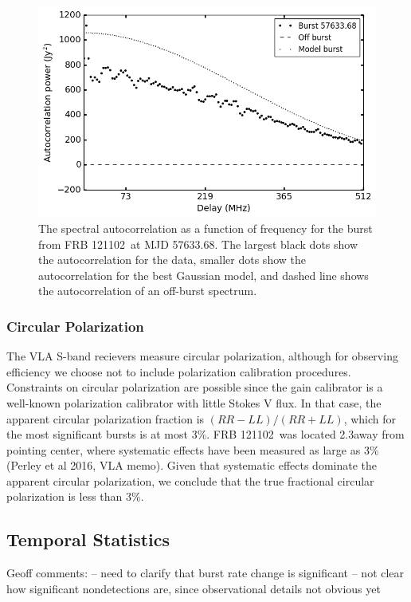 \documentclass[twocolumn]{aastex61}
\newcommand{\frb}{FRB 121102}
\begin{document}

\begin{figure}[htb]
\begin{center}
\includegraphics[width=0.9\columnwidth]{acf_57633_scan7}
\caption{The spectral autocorrelation as a function of frequency for the burst from \frb\ at MJD 57633.68. The largest black dots show the autocorrelation for the data, smaller dots show the autocorrelation for the best Gaussian model, and dashed line shows the autocorrelation of an off-burst spectrum.
\label{fig:acf}}
\end{center}
\end{figure}

\subsubsection{Circular Polarization}
The VLA S-band recievers measure circular polarization, although for observing efficiency we choose not to include polarization calibration procedures. Constraints on circular polarization are possible since the gain calibrator is a well-known polarization calibrator with little Stokes V flux. In that case, the apparent circular polarization fraction is $(RR-LL)/(RR+LL)$, which for the most significant bursts is at most 3\%. \frb\ was located 2.3\arcmin away from pointing center, where systematic effects have been measured as large as 3\% (Perley et al 2016, VLA memo). Given that systematic effects dominate the apparent circular polarization, we conclude that the true fractional circular polarization is less than 3\%.

\subsection{Temporal Statistics}
\label{sec:temp}
Geoff comments:
-- need to clarify that burst rate change is significant
-- not clear how significant nondetections are, since observational details not obvious yet
\end{document}
